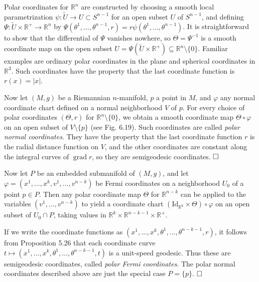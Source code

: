 \begin{example}
\label{ex:polar-normal-coordinates}

Polar coordinates for $\mathbb{R}^n$ are constructed by choosing a smooth local parametrization $\psi: \tilde{U} \to U \subset S^{n-1}$ for an open subset $U$ of $S^{n-1}$, and defining $\Psi: \tilde{U} \times \mathbb{R}^+ \to \mathbb{R}^n$ by $\Psi(\theta^1,\ldots,\theta^{n-1},r) = r\psi(\theta^1,\ldots,\theta^{n-1})$. It is straightforward to show that the differential of $\Psi$ vanishes nowhere, so $\Theta = \Psi^{-1}$ is a smooth coordinate map on the open subset $U = \Psi(\tilde{U} \times \mathbb{R}^+) \subseteq \mathbb{R}^n \setminus \{0\}$. Familiar examples are ordinary polar coordinates in the plane and spherical coordinates in $\mathbb{R}^3$. Such coordinates have the property that the last coordinate function is $r(x) = |x|$.

Now let $(M,g)$ be a Riemannian $n$-manifold, $p$ a point in $M$, and $\varphi$ any normal coordinate chart defined on a normal neighborhood $V$ of $p$. For every choice of polar coordinates $(\Theta, r)$ for $\mathbb{R}^n \setminus \{0\}$, we obtain a smooth coordinate map $\Theta \circ \varphi$ on an open subset of $V \setminus \{p\}$ (see Fig. 6.19). Such coordinates are called \emph{polar normal coordinates}. They have the property that the last coordinate function $r$ is the radial distance function on $V$, and the other coordinates are constant along the integral curves of $\operatorname{grad} r$, so they are semigeodesic coordinates. $\hfill\square$
\end{example}

\begin{example}
\label{ex:polar-fermi-coordinates}

Now let $P$ be an embedded submanifold of $(M,g)$, and let $\varphi = (x^1,\ldots,x^k, v^1,\ldots,v^{n-k})$ be Fermi coordinates on a neighborhood $U_0$ of a point $p \in P$. Then any polar coordinate map $\Theta$ for $\mathbb{R}^{n-k}$ can be applied to the variables $(v^1,\ldots,v^{n-k})$ to yield a coordinate chart $(\text{Id}_{\mathbb{R}^k} \times \Theta) \circ \varphi$ on an open subset of $U_0 \cap P$, taking values in $\mathbb{R}^k \times \mathbb{R}^{n-k-1} \times \mathbb{R}^+$.

If we write the coordinate functions as $(x^1,\ldots,x^k, \theta^1,\ldots,\theta^{n-k-1}, r)$, it follows from Proposition 5.26 that each coordinate curve $t \mapsto (x^1,\ldots,x^k, \theta^1,\ldots,\theta^{n-k-1}, t)$ is a unit-speed geodesic. Thus these are semigeodesic coordinates, called \emph{polar Fermi coordinates}. The polar normal coordinates described above are just the special case $P = \{p\}$. $\hfill\square$
\end{example}

